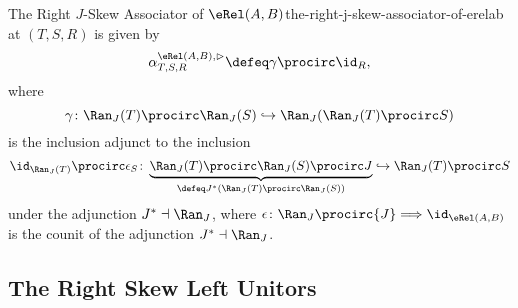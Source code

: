 \begin{definition}{The Right $J$-Skew Associator of $\eRel(A,B)$}{the-right-j-skew-associator-of-erelab}
\[    \]%
    at $(T,S,R)$ is given by
    \[
        \alpha^{\eRel(A,B),\rhd}_{T,S,R}%
        \defeq%
        \gamma\procirc\id_{R},
    \]%
    where
    \[%
        \gamma%
        \colon%
        \Ran_{J}(T)\procirc\Ran_{J}(S)
        \hookrightarrow
        \Ran_{J}(\Ran_{J}(T)\procirc S)
    \]%
    is the inclusion adjunct to the inclusion
    \[
        \id_{\Ran_{J}(T)}\procirc\epsilon_{S}%
        \colon%
        \underbrace{\Ran_{J}(T)\procirc\Ran_{J}(S)\procirc J}_{\defeq J^{*}(\Ran_{J}(T)\procirc\Ran_{J}(S))}%
        \hookrightarrow
        \Ran_{J}(T)\procirc S%
    \]%
    under the adjunction $J^{*}\dashv\Ran_{J}$, where $\epsilon\colon{\Ran_{J}}\procirc{J}\Longrightarrow\id_{\eRel(A,B)}$ is the counit of the adjunction $J^{*}\dashv\Ran_{J}$.
\end{definition}
\subsection{The Right Skew Left Unitors}\label{subsection-the-right-skew-monoidal-structure-on-rel-a-b-the-right-skew-left-unitors}
